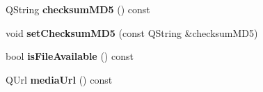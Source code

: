 \begin{DoxyCompactItemize}
\item 
\mbox{\label{class_corpus_recording_ad35668b7ececf5593011ce786968ff47}} 
Q\+String {\bfseries checksum\+M\+D5} () const
\item 
\mbox{\label{class_corpus_recording_ad08087038cfd7ed827a3bb8690c6d3dd}} 
void {\bfseries set\+Checksum\+M\+D5} (const Q\+String \&checksum\+M\+D5)
\item 
\mbox{\label{class_corpus_recording_af9df43d7255a8941658a34cdd3cc2133}} 
bool {\bfseries is\+File\+Available} () const
\item 
\mbox{\label{class_corpus_recording_ad776aea49f4e694bb5c9c115d8176b58}} 
Q\+Url {\bfseries media\+Url} () const
\end{DoxyCompactItemize}
